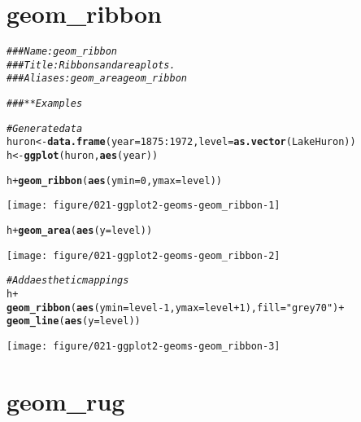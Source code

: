 \documentclass[a4paper,titlepage]{tufte-handout}\usepackage[]{graphicx}\usepackage[]{color}
\makeatletter
\def\maxwidth{ %
  \ifdim\Gin@nat@width>\linewidth
    \linewidth
  \else
    \Gin@nat@width
  \fi
}
\newcommand{\hlnum}[1]{\textcolor[rgb]{0.686,0.059,0.569}{#1}}%
\newcommand{\hlstr}[1]{\textcolor[rgb]{0.192,0.494,0.8}{#1}}%
\newcommand{\hlcom}[1]{\textcolor[rgb]{0.678,0.584,0.686}{\textit{#1}}}%
\newcommand{\hlopt}[1]{\textcolor[rgb]{0,0,0}{#1}}%
\newcommand{\hlstd}[1]{\textcolor[rgb]{0.345,0.345,0.345}{#1}}%
\newcommand{\hlkwb}[1]{\textcolor[rgb]{0.69,0.353,0.396}{#1}}%
\newcommand{\hlkwc}[1]{\textcolor[rgb]{0.333,0.667,0.333}{#1}}%
\newcommand{\hlkwd}[1]{\textcolor[rgb]{0.737,0.353,0.396}{\textbf{#1}}}%
\newenvironment{kframe}{%
 \def\at@end@of@kframe{}%
 \ifinner\ifhmode%
  \def\at@end@of@kframe{\end{minipage}}%
  \begin{minipage}{\columnwidth}%
 \fi\fi%
 \def\FrameCommand##1{\hskip\@totalleftmargin \hskip-\fboxsep
 \colorbox{shadecolor}{##1}\hskip-\fboxsep
     \hskip-\linewidth \hskip-\@totalleftmargin \hskip\columnwidth}%
 \MakeFramed {\advance\hsize-\width
   \@totalleftmargin\z@ \linewidth\hsize
   \@setminipage}}%
 {\par\unskip\endMakeFramed%
 \at@end@of@kframe}
\newenvironment{knitrout}{}{} %
\makeatother
\begin{document}
\section{geom\_ribbon}

\begin{knitrout}
\color{fgcolor}\begin{kframe}
\begin{alltt}
\hlcom{### Name: geom_ribbon}
\hlcom{### Title: Ribbons and area plots.}
\hlcom{### Aliases: geom_area geom_ribbon}

\hlcom{### ** Examples}

\hlcom{# Generate data}
\hlstd{huron} \hlkwb{<-} \hlkwd{data.frame}\hlstd{(}\hlkwc{year} \hlstd{=} \hlnum{1875}\hlopt{:}\hlnum{1972}\hlstd{,} \hlkwc{level} \hlstd{=} \hlkwd{as.vector}\hlstd{(LakeHuron))}
\hlstd{h} \hlkwb{<-} \hlkwd{ggplot}\hlstd{(huron,} \hlkwd{aes}\hlstd{(year))}

\hlstd{h} \hlopt{+} \hlkwd{geom_ribbon}\hlstd{(}\hlkwd{aes}\hlstd{(}\hlkwc{ymin}\hlstd{=}\hlnum{0}\hlstd{,} \hlkwc{ymax}\hlstd{=level))}
\end{alltt}
\end{kframe}
\texttt{[image: figure/021-ggplot2-geoms-geom\_ribbon-1]} 
\begin{kframe}\begin{alltt}
\hlstd{h} \hlopt{+} \hlkwd{geom_area}\hlstd{(}\hlkwd{aes}\hlstd{(}\hlkwc{y} \hlstd{= level))}
\end{alltt}
\end{kframe}
\texttt{[image: figure/021-ggplot2-geoms-geom\_ribbon-2]} 
\begin{kframe}\begin{alltt}
\hlcom{# Add aesthetic mappings}
\hlstd{h} \hlopt{+}
  \hlkwd{geom_ribbon}\hlstd{(}\hlkwd{aes}\hlstd{(}\hlkwc{ymin} \hlstd{= level} \hlopt{-} \hlnum{1}\hlstd{,} \hlkwc{ymax} \hlstd{= level} \hlopt{+} \hlnum{1}\hlstd{),} \hlkwc{fill} \hlstd{=} \hlstr{"grey70"}\hlstd{)} \hlopt{+}
  \hlkwd{geom_line}\hlstd{(}\hlkwd{aes}\hlstd{(}\hlkwc{y} \hlstd{= level))}
\end{alltt}
\end{kframe}
\texttt{[image: figure/021-ggplot2-geoms-geom\_ribbon-3]} 

\end{knitrout}


\section{geom\_rug}
\end{document}
